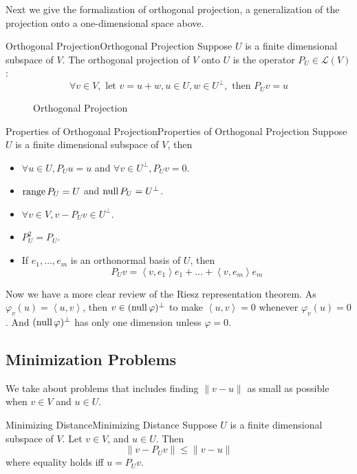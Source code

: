\documentclass[../main.tex]{subfiles}
\begin{document}
Next we give the formalization of orthogonal projection, a generalization of the projection onto a one-dimensional space above.
\begin{definition}{Orthogonal Projection}{Orthogonal Projection}
Suppose $U$ is a finite dimensional subspace of $V$. The orthogonal projection of $V$ onto $U$ is the operator $P_{U}\in \mathscr{L}(V)$ :
\begin{equation}
\forall v\in V, \text{ let }v=u+w,u\in U,w\in U^{\perp}, \text{ then }P_{U}v=u
\end{equation}
\end{definition}
\begin{figure}[H]
    \centering
    \caption{Orthogonal Projection}
    \label{fig:orthogonal-projection}
\end{figure}

\begin{proposition}{Properties of Orthogonal Projection}{Properties of Orthogonal Projection}
Suppose $U$ is a finite dimensional subspace of $V$, then
\begin{itemize}
\item $\forall u\in U,P_Uu=u$ and $\forall v\in U^{\perp}, P_Uv=0$.
\item $\operatorname{range} P_U = U$ and $\operatorname{null} P_U = U^{\perp}$.
\item $\forall v\in V, v-P_Uv\in U^{\perp}$.
\item $P_U^2=P_U$.
\item If $e_1, \ldots ,e_m$ is an orthonormal basis of $U$, then
	\begin{equation*}
	P_Uv = \left<v,e_1\right> e_1+\ldots +\left<v,e_m\right> e_m
	\end{equation*}
\end{itemize}
\end{proposition}

Now we have a more clear review of the Riesz representation theorem. As $\varphi_v(u) = \left<u,v\right>$, then $v\in (\operatorname{null} \varphi)^{\perp}$ to make $\left<u,v\right> =0$ whenever $\varphi_v(u)=0$. And $(\operatorname{null} \varphi)^{\perp}$ has only one dimension unless $\varphi=0$.

\subsection{Minimization Problems}
We take about problems that includes finding $\|v-u\|$ as small as possible when $v\in V$ and $u\in U$.

\begin{theorem}{Minimizing Distance}{Minimizing Distance}
	Suppose $U$ is a finite dimensional subspace of $V$. Let $v\in V$, and $u\in U$. Then
	\begin{equation}
	\|v-P_Uv\| \leq \|v-u\|
	\end{equation}
where equality holds iff $u = P_Uv$.
\end{theorem}
\end{document}
